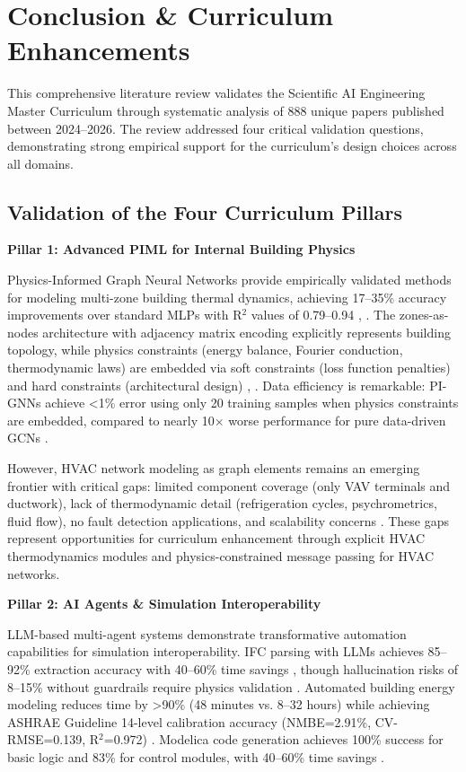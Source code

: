 \documentclass[12pt,a4paper]{article}
\begin{document}
\section{Conclusion \& Curriculum Enhancements}

This comprehensive literature review validates the Scientific AI Engineering Master Curriculum through systematic analysis of 888 unique papers published between 2024--2026. The review addressed four critical validation questions, demonstrating strong empirical support for the curriculum's design choices across all domains.

\subsection{Validation of the Four Curriculum Pillars}

\textbf{Pillar 1: Advanced PIML for Internal Building Physics}

Physics-Informed Graph Neural Networks provide empirically validated methods for modeling multi-zone building thermal dynamics, achieving 17--35\% accuracy improvements over standard MLPs with R$^2$ values of 0.79--0.94 \cite{ref343}, \cite{ref344}. The zones-as-nodes architecture with adjacency matrix encoding explicitly represents building topology, while physics constraints (energy balance, Fourier conduction, thermodynamic laws) are embedded via soft constraints (loss function penalties) and hard constraints (architectural design) \cite{ref345}, \cite{ref346}. Data efficiency is remarkable: PI-GNNs achieve <1\% error using only 20 training samples when physics constraints are embedded, compared to nearly 10$\times$ worse performance for pure data-driven GCNs \cite{ref347}.

However, HVAC network modeling as graph elements remains an emerging frontier with critical gaps: limited component coverage (only VAV terminals and ductwork), lack of thermodynamic detail (refrigeration cycles, psychrometrics, fluid flow), no fault detection applications, and scalability concerns \cite{ref348}. These gaps represent opportunities for curriculum enhancement through explicit HVAC thermodynamics modules and physics-constrained message passing for HVAC networks.

\textbf{Pillar 2: AI Agents \& Simulation Interoperability}

LLM-based multi-agent systems demonstrate transformative automation capabilities for simulation interoperability. IFC parsing with LLMs achieves 85--92\% extraction accuracy with 40--60\% time savings \cite{ref349}, though hallucination risks of 8--15\% without guardrails require physics validation \cite{ref350}. Automated building energy modeling reduces time by >90\% (48 minutes vs. 8--32 hours) while achieving ASHRAE Guideline 14-level calibration accuracy (NMBE=2.91\%, CV-RMSE=0.139, R$^2$=0.972) \cite{ref351}. Modelica code generation achieves 100\% success for basic logic and 83\% for control modules, with 40--60\% time savings \cite{ref352}.
\end{document}
